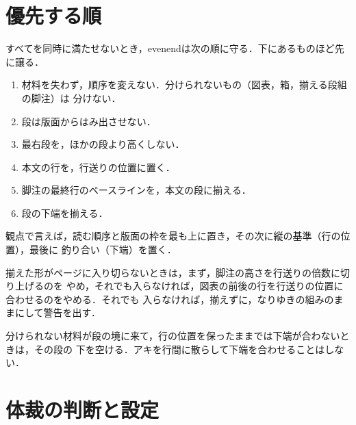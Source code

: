 \documentclass[twocolumn,paper=a4,fontsize=10pt]{jlreq}
\newcommand\ichidan{\evenendcolumns{1}}
\begin{document}
\section{優先する順}\label{sec:priority}

すべてを同時に満たせないとき，evenendは次の順に守る．下にあるものほど先に譲る．
\begin{enumerate}
  \item 材料を失わず，順序を変えない．分けられないもの（図表，箱，揃える段組の脚注）は
    分けない．
  \item 段は版面からはみ出させない．
  \item 最右段を，ほかの段より高くしない．
  \item 本文の行を，行送りの位置に置く．
  \item 脚注の最終行のベースラインを，本文の段に揃える．
  \item 段の下端を揃える．
\end{enumerate}
観点で言えば，読む順序と版面の枠を最も上に置き，その次に縦の基準（行の位置），最後に
釣り合い（下端）を置く．

揃えた形がページに入り切らないときは，まず，脚注の高さを行送りの倍数に切り上げるのを
やめ，それでも入らなければ，図表の前後の行を行送りの位置に合わせるのをやめる．それでも
入らなければ，揃えずに，なりゆきの組みのままにして警告を出す．

分けられない材料が段の境に来て，行の位置を保ったままでは下端が合わないときは，その段の
下を空ける．アキを行間に散らして下端を合わせることはしない．

\ichidan
\section{体裁の判断と設定}
\end{document}
